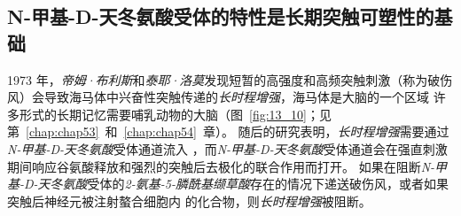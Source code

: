 \subsection{N-甲基-D-天冬氨酸受体的特性是长期突触可塑性的基础}

1973 年，\textit{帝姆·布利斯}和\textit{泰耶·洛莫}发现短暂的高强度和高频突触刺激（称为破伤风）会导致海马体中兴奋性突触传递的\textit{长时程增强}，海马体是大脑的一个区域 许多形式的长期记忆需要哺乳动物的大脑（图~\ref{fig:13_10}；见第~\ref{chap:chap53}~和~\ref{chap:chap54}~章）。
随后的研究表明，\textit{长时程增强}需要通过\textit{N-甲基-D-天冬氨酸}受体通道流入 ，而\textit{N-甲基-D-天冬氨酸}受体通道会在强直刺激期间响应谷氨酸释放和强烈的突触后去极化的联合作用而打开。
如果在阻断\textit{N-甲基-D-天冬氨酸}受体的\textit{2-氨基-5-膦酰基缬草酸}存在的情况下递送破伤风，或者如果突触后神经元被注射螯合细胞内  的化合物，则\textit{长时程增强}被阻断。


